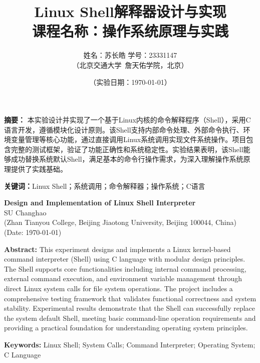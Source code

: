 \documentclass[10pt,twoside]{ctexart}
\title{%
    {\LARGE\bfseries Linux Shell解释器设计与实现}\\[0.5cm]
    {\large 课程名称：操作系统原理与实践}%
}
\author{%
    {\large 姓名：苏长皓 \qquad 学号：23331147}\\[0.2cm]
    {\small （北京交通大学~詹天佑学院，北京）}%
}
\date{{\large （实验日期：\today）}}
\renewenvironment{abstract}{%
  \noindent\textbf{摘\quad 要：}}{\par}
\newcommand{\keywords}[1]{%
  \noindent\textbf{关键词：}#1\par}
\newenvironment{enabstract}{%
  \noindent\textbf{Abstract: }}{\par}
\newcommand{\enkeywords}[1]{%
  \noindent\textbf{Keywords: }#1\par}
\begin{document}
\maketitle
\thispagestyle{fancy}

\begin{abstract}
本实验设计并实现了一个基于Linux内核的命令解释程序（Shell），采用C语言开发，遵循模块化设计原则。该Shell支持内部命令处理、外部命令执行、环境变量管理等核心功能，通过直接调用Linux系统调用实现文件系统操作。项目包含完整的测试框架，验证了功能正确性和系统稳定性。实验结果表明，该Shell能够成功替换系统默认Shell，满足基本的命令行操作需求，为深入理解操作系统原理提供了实践基础。
\end{abstract}

\keywords{Linux Shell；系统调用；命令解释器；操作系统；C语言}

\vspace{0.5cm}

\begin{center}
{\large\bfseries Design and Implementation of Linux Shell Interpreter}\\[0.3cm]
{\normalsize SU Changhao}\\[0.2cm]
{\small (Zhan Tianyou College, Beijing Jiaotong University, Beijing 100044, China)}\\[0.2cm]
{\small (Date: \today)}
\end{center}

\begin{enabstract}
This experiment designs and implements a Linux kernel-based command interpreter (Shell) using C language with modular design principles. The Shell supports core functionalities including internal command processing, external command execution, and environment variable management through direct Linux system calls for file system operations. The project includes a comprehensive testing framework that validates functional correctness and system stability. Experimental results demonstrate that the Shell can successfully replace the system default Shell, meeting basic command-line operation requirements and providing a practical foundation for understanding operating system principles.
\end{enabstract}

\enkeywords{Linux Shell; System Calls; Command Interpreter; Operating System; C Language}

\vspace{0.5cm}
\end{document}
